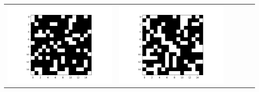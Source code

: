 \documentclass[12pt]{report}
\begin{document}
\begin{table}[H]
  \centering
  \begin{tabular}{  c  c  c  c  c  c }
    \begin{minipage}{.15\textwidth}
      \includegraphics[scale=0.2]{BM_ahidden.png}
    \end{minipage} &
    \begin{minipage}{.15\textwidth}
      \includegraphics[scale=0.2]{BM_bhidden.png}
    \end{minipage} &
    \begin{minipage}{.15\textwidth}

\end{minipage}
\end{tabular}
\end{table}
\end{document}
